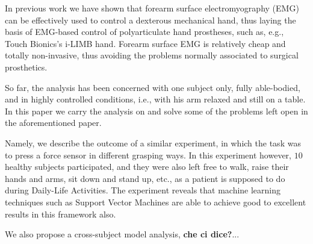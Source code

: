 In previous work \cite{2008.ICRA,2008.BioCyb} we have shown that
forearm surface electromyography (EMG) can be effectively used to
control a dexterous mechanical hand, thus laying the basis of
EMG-based control of polyarticulate hand prostheses, such as, e.g.,
Touch Bionics's i-LIMB hand. Forearm surface EMG is relatively cheap
and totally non-invasive, thus avoiding the problems normally
associated to surgical prosthetics.

So far, the analysis has been concerned with one subject only, fully
able-bodied, and in highly controlled conditions, i.e., with his arm
relaxed and still on a table. In this paper we carry the analysis on
and solve some of the problems left open in the aforementioned
paper.

Namely, we describe the outcome of a similar experiment, in which the
task was to press a force sensor in different grasping ways. In this
experiment however, $10$ healthy subjects participated, and they were
also left free to walk, raise their hands and arms, sit down and stand
up, etc., as a patient is supposed to do during Daily-Life
Activities. The experiment reveals that machine learning techniques
such as Support Vector Machines are able to achieve good to excellent
results in this framework also.

We also propose a cross-subject model analysis, \textbf{che ci
dice?}...
